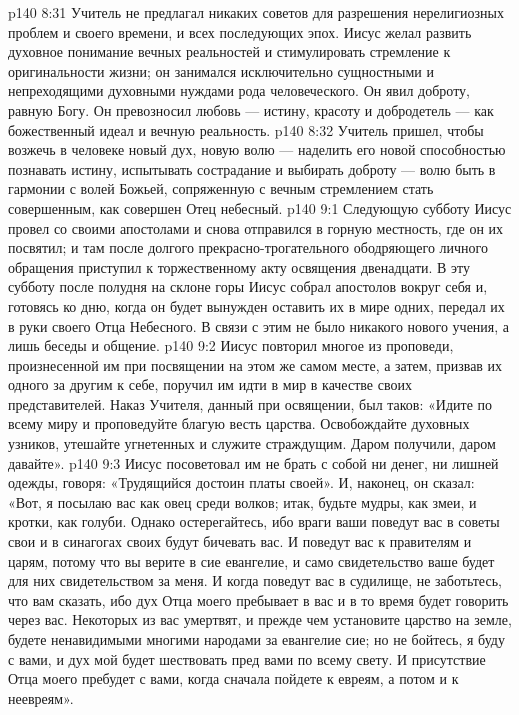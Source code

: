\vs p140 8:31 Учитель не предлагал никаких советов для разрешения нерелигиозных проблем и своего времени, и всех последующих эпох. Иисус желал развить духовное понимание вечных реальностей и стимулировать стремление к оригинальности жизни; он занимался исключительно сущностными и непреходящими духовными нуждами рода человеческого. Он явил доброту, равную Богу. Он превозносил любовь --- истину, красоту и добродетель --- как божественный идеал и вечную реальность.
\vs p140 8:32 Учитель пришел, чтобы возжечь в человеке новый дух, новую волю --- наделить его новой способностью познавать истину, испытывать сострадание и выбирать доброту --- волю быть в гармонии с волей Божьей, сопряженную с вечным стремлением стать совершенным, как совершен Отец небесный.
\vs p140 9:1 Следующую субботу Иисус провел со своими апостолами и снова отправился в горную местность, где он их посвятил; и там после долгого прекрасно\hyp{}трогательного ободряющего личного обращения приступил к торжественному акту освящения двенадцати. В эту субботу после полудня на склоне горы Иисус собрал апостолов вокруг себя и, готовясь ко дню, когда он будет вынужден оставить их в мире одних, передал их в руки своего Отца Небесного. В связи с этим не было никакого нового учения, а лишь беседы и общение.
\vs p140 9:2 Иисус повторил многое из проповеди, произнесенной им при посвящении на этом же самом месте, а затем, призвав их одного за другим к себе, поручил им идти в мир в качестве своих представителей. Наказ Учителя, данный при освящении, был таков: «Идите по всему миру и проповедуйте благую весть царства. Освобождайте духовных узников, утешайте угнетенных и служите страждущим. Даром получили, даром давайте».
\vs p140 9:3 Иисус посоветовал им не брать с собой ни денег, ни лишней одежды, говоря: «Трудящийся достоин платы своей». И, наконец, он сказал: «Вот, я посылаю вас как овец среди волков; итак, будьте мудры, как змеи, и кротки, как голуби. Однако остерегайтесь, ибо враги ваши поведут вас в советы свои и в синагогах своих будут бичевать вас. И поведут вас к правителям и царям, потому что вы верите в сие евангелие, и само свидетельство ваше будет для них свидетельством за меня. И когда поведут вас в судилище, не заботьтесь, что вам сказать, ибо дух Отца моего пребывает в вас и в то время будет говорить через вас. Некоторых из вас умертвят, и прежде чем установите царство на земле, будете ненавидимыми многими народами за евангелие сие; но не бойтесь, я буду с вами, и дух мой будет шествовать пред вами по всему свету. И присутствие Отца моего пребудет с вами, когда сначала пойдете к евреям, а потом и к неевреям».
